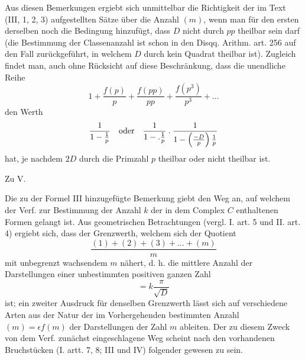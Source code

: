 %
Aus diesen Bemerkungen ergiebt sich unmittelbar die Richtigkeit der im Text (III, 1, 2, 3) aufgestellten Sätze über die Anzahl $(m)$, wenn man für den ersten derselben noch die Bedingung hinzufügt, dass $D$ nicht durch $pp$ theilbar sein darf (die Bestimmung der Classenanzahl ist schon in den Disqq. Arithm. art. 256 auf den Fall zurückgeführt, in welchem $D$ durch kein Quadrat theilbar ist). Zugleich findet man, auch ohne Rücksicht auf diese Beschränkung, dass die unendliche Reihe
\[
1+\frac{f(p)}p+\frac{f(pp)}{pp}+\frac{f(p^3)}{p^3}+\ldots
\]
den Werth
\[
\frac1{1-\frac1p}\quad\text{oder}\quad\frac1{1-.\frac1p}\mathbin{.}\frac1{1-\left(\frac{-D}p\right)\frac1p}
\]
hat, je nachdem $2D$ durch die Primzahl $p$ theilbar oder nicht theilbar ist.

\par\medskip{}\centerline{Zu V.}\smallskip
Die zu der Formel III hinzugefügte Bemerkung giebt den Weg an, auf welchem der Verf. zur Bestimmung der Anzahl $k$ der in dem Complex $C$ enthaltenen Formen gelangt ist. Aus geometrischen Betrachtungen (vergl. I. art. 5 und II. art. 4) ergiebt sich, dass der Grenzwerth, welchem sich der Quotient
\[
\frac{(1)+(2)+(3)+\ldots+(m)}m
\]
mit unbegrenzt wachsendem $m$ nähert, d. h. die mittlere Anzahl der Darstellungen einer unbestimmten positiven ganzen Zahl
\[
=k\frac\pi{\surd D}
\]
ist; ein zweiter Ausdruck für denselben Grenzwerth lässt sich auf verschiedene Arten aus der Natur der im Vorhergehenden bestimmten Anzahl $(m)=\epsilon f(m)$ der Darstellungen der Zahl $m$ ableiten. Der zu diesem Zweck von dem Verf. zunächst eingeschlagene Weg scheint nach den vorhandenen Bruchstücken (I. artt. 7, 8; III und IV) folgender gewesen zu sein.

